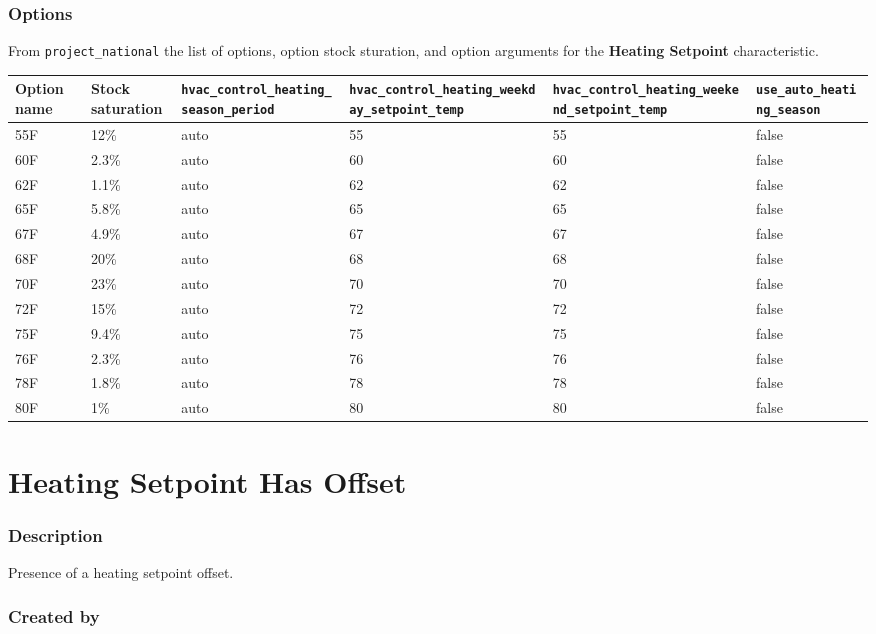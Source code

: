 \subsubsection{Options}\label{options-87}

From \texttt{project\_national} the list of options, option stock
sturation, and option arguments for the \textbf{Heating Setpoint}
characteristic.

\begin{longtable}[]{@{}llllll@{}}
\toprule\noalign{}
Option name & Stock saturation &
\texttt{hvac\_control\_heating\_season\_period} &
\texttt{hvac\_control\_heating\_weekday\_setpoint\_temp} &
\texttt{hvac\_control\_heating\_weekend\_setpoint\_temp} &
\texttt{use\_auto\_heating\_season} \\
\midrule\noalign{}
\endhead
\bottomrule\noalign{}
\endlastfoot
55F & 12\% & auto & 55 & 55 & false \\
60F & 2.3\% & auto & 60 & 60 & false \\
62F & 1.1\% & auto & 62 & 62 & false \\
65F & 5.8\% & auto & 65 & 65 & false \\
67F & 4.9\% & auto & 67 & 67 & false \\
68F & 20\% & auto & 68 & 68 & false \\
70F & 23\% & auto & 70 & 70 & false \\
72F & 15\% & auto & 72 & 72 & false \\
75F & 9.4\% & auto & 75 & 75 & false \\
76F & 2.3\% & auto & 76 & 76 & false \\
78F & 1.8\% & auto & 78 & 78 & false \\
80F & 1\% & auto & 80 & 80 & false \\
\end{longtable}

\section{Heating Setpoint Has
Offset}\label{heating_setpoint_has_offset}

\subsubsection{Description}\label{description-88}

Presence of a heating setpoint offset.

\subsubsection{Created by}\label{created-by-88}

